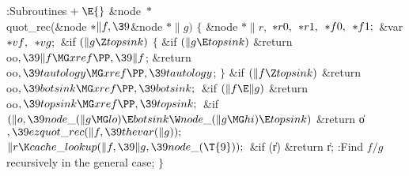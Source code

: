 \Y\B\4:Subroutines\X${}\mathrel+\E{}$\6
\&{node} ${}{*}{}$\\{quot\_rec}(\&{node} ${}{*}\|f,\39{}$\&{node} ${}{*}\|g){}$%
\1\1\2\2\6
${}\{{}$\1\6
\&{node} ${}{*}\|r,{}$ ${}{*}\\{r0},{}$ ${}{*}\\{r1},{}$ ${}{*}\\{f0},{}$
${}{*}\\{f1};{}$\6
\&{var} ${}{*}\\{vf},{}$ ${}{*}\\{vg};{}$\7
\&{if} ${}(\|g\Z\\{topsink}){}$\5
${}\{{}$\1\6
\&{if} ${}(\|g\E\\{topsink}){}$\1\5
\&{return} \\{oo}${},\39\|f\MG\\{xref}\PP,\39\|f{}$;\2%
\6
\&{return} \\{oo}${},\39\\{tautology}\MG\\{xref}\PP,\39\\{tautology}{}$;\6
\4${}\}{}$\2\6
\&{if} ${}(\|f\Z\\{topsink}){}$\1\5
\&{return} \\{oo}${},\39\\{botsink}\MG\\{xref}\PP,\39\\{botsink};{}$\2\6
\&{if} ${}(\|f\E\|g){}$\1\5
\&{return} \\{oo}${},\39\\{topsink}\MG\\{xref}\PP,\39\\{topsink};{}$\2\6
\&{if} ${}(\|o,\39\\{node\_}(\|g\MG\\{lo})\E\\{botsink}\W\\{node\_}(\|g\MG%
\\{hi})\E\\{topsink}){}$\1\5
\&{return} \|o${},\39\\{ezquot\_rec}(\|f,\39\\{thevar}(\|g));{}$\2\6
${}\|r\K\\{cache\_lookup}(\|f,\39\|g,\39\\{node\_}(\T{9}));{}$\6
\&{if} (\|r)\1\5
\&{return} \|r;\2\6
:Find $f/g$ recursively in the general case\X;\6
\4${}\}{}$\2\par
\fi

